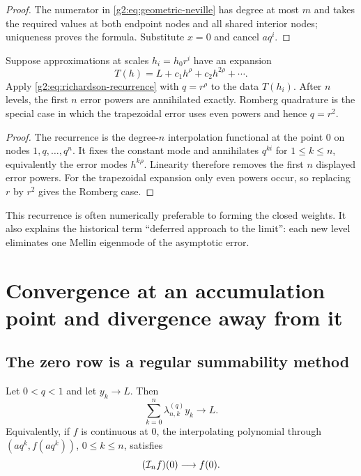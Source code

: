 \begin{proof}
The numerator in \eqref{g2:eq:geometric-neville} has degree at most $m$ and takes
the required values at both endpoint nodes and all shared interior nodes;
uniqueness proves the formula.  Substitute $x=0$ and cancel $aq^i$.
\end{proof}

\begin{corollary}
\label{g2:cor:richardson}
Suppose approximations at scales $h_i=h_0r^i$ have an expansion
\[
 T(h)=L+c_1h^\rho+c_2h^{2\rho}+\cdots.
\]
Apply \eqref{g2:eq:richardson-recurrence} with $q=r^\rho$ to the data $T(h_i)$.
After $n$ levels, the first $n$ error powers are annihilated exactly.  Romberg
quadrature is the special case in which the trapezoidal error uses even powers
and hence $q=r^2$.
\end{corollary}

\begin{proof}
The recurrence is the degree-$n$ interpolation functional at the point
$0$ on nodes $1,q,\ldots,q^n$.  It fixes the constant mode and annihilates
$q^{ki}$ for $1\le k\le n$, equivalently the error modes
$h^{k\rho}$.  Linearity therefore removes the first $n$ displayed error
powers.  For the trapezoidal expansion only even powers occur, so replacing
$r$ by $r^2$ gives the Romberg case.
\end{proof}

\begin{remark}
This recurrence is often numerically preferable to forming the closed weights.
It also explains the historical term ``deferred approach to the limit'': each
new level eliminates one Mellin eigenmode of the asymptotic error.
\end{remark}


\section{Convergence at an accumulation point and divergence away from it}
\label{g2:sec:superflat}

\subsection{The zero row is a regular summability method}

\begin{theorem}
\label{g2:thm:regular-summability}
Let $0<q<1$ and let $y_k\to L$.  Then
\begin{equation}
 \sum_{k=0}^n\lambda_{n,k}^{(q)}y_k\longrightarrow L.
 \label{g2:eq:regular-summability}
\end{equation}
Equivalently, if $f$ is continuous at $0$, the interpolating polynomial through
$(aq^k,f(aq^k))$, $0\le k\le n$, satisfies
\begin{equation}
 (\mathcal I_nf)(0)\longrightarrow f(0).
 \label{g2:eq:continuous-zero-convergence}
\end{equation}
\end{theorem}

